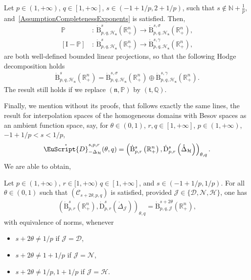 \documentclass[AHL,Unicode,longabstracts,published]{cedram}
\newcommand{\bbP}{\mathbb{P}}
\newcommand{\bbR}{\mathbb{R}}
\newcommand{\bbN}{\mathbb{N}}
\newcommand{\bbQ}{\mathbb{Q}}
\newcommand{\rmB}{\mathrm{B}}
\newcommand{\rmD}{\mathrm{D}}
\newcommand{\rmI}{\mathrm{I}}
\newcommand{\clH}{\mathcal{H}}
\newcommand{\clC}{\mathcal{C}}
\newcommand{\clN}{\mathcal{N}}
\newcommand{\clJ}{\mathcal{J}}
\newcommand{\clD}{\mathcal{D}}
\newcommand{\fkn}{\mathfrak{n}}
\newcommand{\fkt}{\mathfrak{t}}
\newcommand{\rgeusD}{\mathring{\eus{D}}}
\newcommand{\eus}{\EuScript}
\begin{document}
\begin{coro}\label{cor:extendedHodgeDecompComptabilityConditions}
Let $p\in(1,+\infty)$, $q\in[1,+\infty]$, $s\in(-1+1/p,2+1/p)$, such that $s\notin \bbN +\frac{1}{p}$, and~\eqref{AssumptionCompletenessExponents} is satisfied. Then,
\begin{align*}
\bbP&\,:\,\dot{\rmB}^{s}_{p,q,\clH_{\fkn}}\left(\bbR^n_+\right) \longrightarrow \dot{\rmB}^{s,\sigma}_{p,q,\clH_{\fkn}}\left(\bbR^n_+\right),\\
[\rmI -\bbP]&\,:\,\dot{\rmB}^{s}_{p,q,\clH_{\fkn}}\left(\bbR^n_+\right) \longrightarrow \dot{\rmB}^{s,\gamma}_{p,q,\clH_{\fkn}}\left(\bbR^n_+\right),
\end{align*}
are both well-defined bounded linear projections, so that the following Hodge decomposition holds
\begin{align*}
\dot{\rmB}^{s}_{p,q,\clH_{\fkn}}\left(\bbR^n_+\right) = \dot{\rmB}^{s,\sigma}_{p,q,\clH_{\fkn}}\left(\bbR^n_+\right) \oplus \dot{\rmB}^{s,\gamma}_{p,q,\clH_{\fkn}}\left(\bbR^n_+\right) .
\end{align*}
The result still holds if we replace $(\fkn,\bbP)$ by $(\fkt,\bbQ)$.
\end{coro}



Finally, we mention without its proofs, that follows exactly the same lines, the result for interpolation spaces of the homogeneous domains with Besov spaces as an ambient function space, say, for $\theta\in(0,1)$, $r,q\in[1,+\infty]$, $p\in(1,+\infty)$, $-1+1/p<s<1/p$,
\begin{align*}
\rgeusD^{s,p,r}_{-\Delta_{\clH}}(\theta,q) = \left(\dot{\rmB}^{s}_{p,r}\left(\bbR^n_+\right),\dot{\rmD}^{s}_{p,r}\left(\mathring{\Delta}_{\clH}\right)\right)_{\theta,q} .
\end{align*}
We are able to obtain,

\begin{prop}\label{prop:InterpHomDomainBesovLaplacians}
Let $p\in(1,+\infty)$, $r\in[1,+\infty)$ $q\in[1,+\infty]$, and $s\in(-1+1/p,1/p)$. For all $\theta\in(0,1)$ such that $(\clC_{s+2\theta,p,q})$ is satisfied, provided $\clJ\in\{\clD,\clN,\clH\}$, one has
\begin{align*}
\left(\dot{\rmB}^{s}_{p,r}\left(\bbR^n_+\right),\dot{\rmD}^{s}_{p,r}\left(\mathring{\Delta}_\clJ\right)\right)_{\theta,q} = \dot{\rmB}^{s+2\theta}_{p,q,\clJ}\left(\bbR^n_+\right),
\end{align*}
with equivalence of norms, whenever
\begin{itemize}
\item $s+2\theta\neq 1/p$ if $\clJ=\clD$,
\item $s+2\theta\neq 1+1/p$ if $\clJ=\clN$,
\item $s+2\theta\neq 1/p,1+1/p$ if $\clJ=\clH$.
\end{itemize}
\end{prop}
\end{document}
